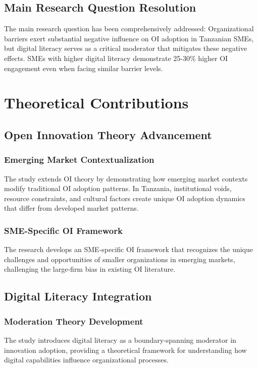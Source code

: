 \subsection{Main Research Question Resolution}

The main research question has been comprehensively addressed: Organizational barriers exert substantial negative influence on OI adoption in Tanzanian SMEs, but digital literacy serves as a critical moderator that mitigates these negative effects. SMEs with higher digital literacy demonstrate 25-30\% higher OI engagement even when facing similar barrier levels.

\section{Theoretical Contributions}

\subsection{Open Innovation Theory Advancement}

\subsubsection{Emerging Market Contextualization}
The study extends OI theory by demonstrating how emerging market contexts modify traditional OI adoption patterns. In Tanzania, institutional voids, resource constraints, and cultural factors create unique OI adoption dynamics that differ from developed market patterns.

\subsubsection{SME-Specific OI Framework}
The research develops an SME-specific OI framework that recognizes the unique challenges and opportunities of smaller organizations in emerging markets, challenging the large-firm bias in existing OI literature.

\subsection{Digital Literacy Integration}

\subsubsection{Moderation Theory Development}
The study introduces digital literacy as a boundary-spanning moderator in innovation adoption, providing a theoretical framework for understanding how digital capabilities influence organizational processes.

